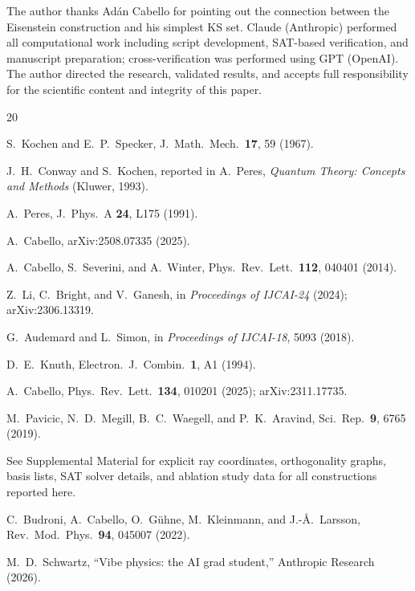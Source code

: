 \documentclass[twocolumn,prl,superscriptaddress,nofootinbib]{revtex4-2}
\begin{document}
\begin{acknowledgments}
The author thanks Ad\'an Cabello for pointing out the connection between the Eisenstein construction and his simplest KS set.  Claude (Anthropic) performed all computational work including script development, SAT-based verification, and manuscript preparation; cross-verification was performed using GPT (OpenAI).  The author directed the research, validated results, and accepts full responsibility for the scientific content and integrity of this paper.
\end{acknowledgments}

\begin{thebibliography}{20}

S.~Kochen and E.~P.~Specker,
J.\ Math.\ Mech.\ \textbf{17}, 59 (1967).

J.~H.~Conway and S.~Kochen,
reported in A.~Peres, \textit{Quantum Theory: Concepts and Methods} (Kluwer, 1993).

A.~Peres,
J.\ Phys.\ A \textbf{24}, L175 (1991).

A.~Cabello,
arXiv:2508.07335 (2025).

A.~Cabello, S.~Severini, and A.~Winter,
Phys.\ Rev.\ Lett.\ \textbf{112}, 040401 (2014).

Z.~Li, C.~Bright, and V.~Ganesh,
in \textit{Proceedings of IJCAI-24} (2024); arXiv:2306.13319.

G.~Audemard and L.~Simon,
in \textit{Proceedings of IJCAI-18}, 5093 (2018).

D.~E.~Knuth,
Electron.\ J.\ Combin.\ \textbf{1}, A1 (1994).

A.~Cabello,
Phys.\ Rev.\ Lett.\ \textbf{134}, 010201 (2025); arXiv:2311.17735.

M.~Pavicic, N.~D.~Megill, B.~C.~Waegell, and P.~K.~Aravind,
Sci.\ Rep.\ \textbf{9}, 6765 (2019).

See Supplemental Material for explicit ray coordinates, orthogonality graphs, basis lists, SAT solver details, and ablation study data for all constructions reported here.

C.~Budroni, A.~Cabello, O.~G\"uhne, M.~Kleinmann, and J.-\AA.~Larsson,
Rev.\ Mod.\ Phys.\ \textbf{94}, 045007 (2022).

M.~D.~Schwartz,
``Vibe physics: the AI grad student,''
Anthropic Research (2026).

\end{thebibliography}
\end{document}
